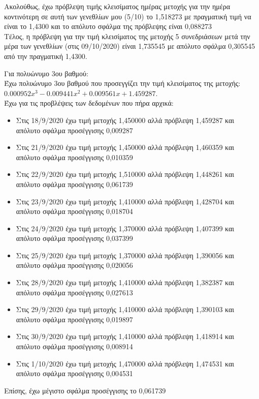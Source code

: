 \documentclass[a4paper,11pt]{article}
\newcommand{\lt}{\latintext}
\begin{document}
Ακολούθως, έχω πρόβλεψη τιμής κλεισίματος ημέρας μετοχής για την ημέρα κοντινότερη σε αυτή των γενεθλίων μου (5/10) το 1,518273 με πραγματική τιμή να είναι το 1,4300 και το απόλυτο σφάλμα της πρόβλεψης είναι 0,088273\\

Τέλος, η πρόβλεψη για την τιμή κλεισίματος της μετοχής 5 συνεδριάσεων μετά την μέρα των γενεθλίων (στις 09/10/2020) είναι 1,735545 με απόλυτο σφάλμα 0,305545 από την πραγματική 1,4300.\\

\par 
Για πολυώνυμο 3ου βαθμού:\\

Έχω πολυώνυμο 3ου βαθμού που προσεγγίζει την τιμή κλεισίματος της μετοχής: {\lt $0.000952x^3 -0.009441x^2 + 0.009561x + 1.459287$}.\\


Έχω για τις προβλέψεις των δεδομένων που πήρα αρχικά:
\begin{itemize}
	\item Στις 18/9/2020 έχω τιμή μετοχής 1,450000 αλλά πρόβλεψη 1,459287 και απόλυτο σφάλμα προσέγγισης 0,009287
	\item Στις 21/9/2020 έχω τιμή μετοχής 1,450000 αλλά πρόβλεψη 1,460359 και απόλυτο σφάλμα προσέγγισης 0,010359
	\item Στις 22/9/2020 έχω τιμή μετοχής 1,510000 αλλά πρόβλεψη 1,448261 και απόλυτο σφάλμα προσέγγισης 0,061739
	\item Στις 23/9/2020 έχω τιμή μετοχής 1,410000 αλλά πρόβλεψη 1,428704 και απόλυτο σφάλμα προσέγγισης 0,018704
	\item Στις 24/9/2020 έχω τιμή μετοχής 1,370000 αλλά πρόβλεψη 1,407399 και απόλυτο σφάλμα προσέγγισης 0,037399
	\item Στις 25/9/2020 έχω τιμή μετοχής 1,370000 αλλά πρόβλεψη 1,390056 και απόλυτο σφάλμα προσέγγισης 0,020056
	\item Στις 28/9/2020 έχω τιμή μετοχής 1,410000 αλλά πρόβλεψη 1,382387 και απόλυτο σφάλμα προσέγγισης 0,027613
	\item Στις 29/9/2020 έχω τιμή μετοχής 1,410000 αλλά πρόβλεψη 1,390103 και απόλυτο σφάλμα προσέγγισης 0,019897
	\item Στις 30/9/2020 έχω τιμή μετοχής 1,410000 αλλά πρόβλεψη 1,418914 και απόλυτο σφάλμα προσέγγισης 0,008914
	\item Στις 1/10/2020 έχω τιμή μετοχής 1,470000 αλλά πρόβλεψη 1,474531 και απόλυτο σφάλμα προσέγγισης 0,004531
\end{itemize}
Επίσης, έχω μέγιστο σφάλμα προσέγγισης το 0,061739\\
\end{document}
